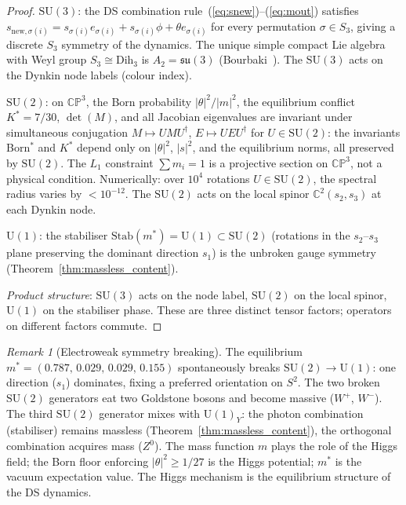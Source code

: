 \documentclass[11pt,a4paper]{article}
\theoremstyle{definition}
\theoremstyle{remark}
\newtheorem{remark}[theorem]{Remark}
\newcommand{\CP}{\mathbb{CP}}
\newcommand{\C}{\mathbb{C}}
\newcommand{\SU}{\mathrm{SU}}
\begin{document}
\begin{proof}
\emph{$\SU(3)$}: the DS combination rule~(\ref{eq:snew})--(\ref{eq:mout}) satisfies $s_{\mathrm{new},\sigma(i)}=s_{\sigma(i)}e_{\sigma(i)}+s_{\sigma(i)}\phi+\theta e_{\sigma(i)}$ for every permutation $\sigma\in S_3$, giving a discrete $S_3$ symmetry of the dynamics. The unique simple compact Lie algebra with Weyl group $S_3\cong\mathrm{Dih}_3$ is $A_2=\mathfrak{su}(3)$ (Bourbaki~\cite{Bourbaki}). The $\SU(3)$ acts on the Dynkin node labels (colour index).

\emph{$\SU(2)$}: on $\CP^3$, the Born probability $|\theta|^2/|m|^2$, the equilibrium conflict $K^*=7/30$, $\det(M)$, and all Jacobian eigenvalues are invariant under simultaneous conjugation $M\mapsto UMU^\dagger$, $E\mapsto UEU^\dagger$ for $U\in\SU(2)$: the invariants Born${}^*$ and $K^*$ depend only on $|\theta|^2$, $|s|^2$, and the equilibrium norms, all preserved by $\SU(2)$. The $L_1$ constraint $\sum m_i=1$ is a projective section on $\CP^3$, not a physical condition. Numerically: over $10^4$ rotations $U\in\SU(2)$, the spectral radius varies by $<10^{-12}$. The $\SU(2)$ acts on the local spinor $\C^2(s_2,s_3)$ at each Dynkin node.

\emph{$\mathrm{U}(1)$}: the stabiliser $\mathrm{Stab}(m^*)=\mathrm{U}(1)\subset\SU(2)$ (rotations in the $s_2$--$s_3$ plane preserving the dominant direction $s_1$) is the unbroken gauge symmetry (Theorem~\ref{thm:massless_content}).

\emph{Product structure}: $\SU(3)$ acts on the node label, $\SU(2)$ on the local spinor, $\mathrm{U}(1)$ on the stabiliser phase. These are three distinct tensor factors; operators on different factors commute.
\end{proof}

\begin{remark}[Electroweak symmetry breaking]\label{rem:ewsb}
The equilibrium $m^*=(0.787,\,0.029,\,0.029,\,0.155)$ spontaneously breaks $\SU(2)\to\mathrm{U}(1)$: one direction ($s_1$) dominates, fixing a preferred orientation on $S^2$. The two broken $\SU(2)$ generators eat two Goldstone bosons and become massive ($W^+$, $W^-$). The third $\SU(2)$ generator mixes with $\mathrm{U}(1)_Y$: the photon combination (stabiliser) remains massless (Theorem~\ref{thm:massless_content}), the orthogonal combination acquires mass ($Z^0$). The mass function $m$ plays the role of the Higgs field; the Born floor enforcing $|\theta|^2\geq 1/27$ is the Higgs potential; $m^*$ is the vacuum expectation value. The Higgs mechanism is the equilibrium structure of the DS dynamics.
\end{remark}
\end{document}

